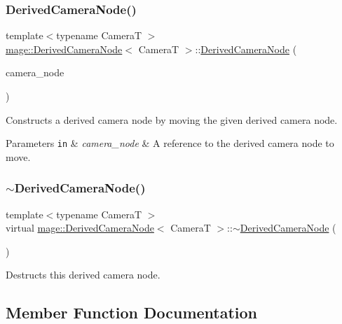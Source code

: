 \subsubsection{\texorpdfstring{Derived\+Camera\+Node()}{DerivedCameraNode()}\hspace{0.1cm}{\footnotesize\ttfamily [4/4]}}
{\footnotesize\ttfamily template$<$typename CameraT $>$ \\
\hyperlink{classmage_1_1_derived_camera_node}{mage\+::\+Derived\+Camera\+Node}$<$ CameraT $>$\+::\hyperlink{classmage_1_1_derived_camera_node}{Derived\+Camera\+Node} (\begin{DoxyParamCaption}\item[{\hyperlink{classmage_1_1_derived_camera_node}{Derived\+Camera\+Node}$<$ CameraT $>$ \&\&}]{camera\+\_\+node }\end{DoxyParamCaption})}

Constructs a derived camera node by moving the given derived camera node.


\begin{DoxyParams}[1]{Parameters}
\mbox{\tt in}  & {\em camera\+\_\+node} & A reference to the derived camera node to move. \\
\hline
\end{DoxyParams}
\hypertarget{classmage_1_1_derived_camera_node_a74ab678b593c43b6bf95bb7fbfbd4d2d}{}\label{classmage_1_1_derived_camera_node_a74ab678b593c43b6bf95bb7fbfbd4d2d} 
\subsubsection{\texorpdfstring{$\sim$\+Derived\+Camera\+Node()}{~DerivedCameraNode()}}
{\footnotesize\ttfamily template$<$typename CameraT $>$ \\
virtual \hyperlink{classmage_1_1_derived_camera_node}{mage\+::\+Derived\+Camera\+Node}$<$ CameraT $>$\+::$\sim$\hyperlink{classmage_1_1_derived_camera_node}{Derived\+Camera\+Node} (\begin{DoxyParamCaption}{ }\end{DoxyParamCaption})\hspace{0.3cm}{\ttfamily [virtual]}}

Destructs this derived camera node. 

\subsection{Member Function Documentation}
\hypertarget{classmage_1_1_derived_camera_node_a29e597fe2c9e0f37eeab8fec5330d764}{}\label{classmage_1_1_derived_camera_node_a29e597fe2c9e0f37eeab8fec5330d764} 
